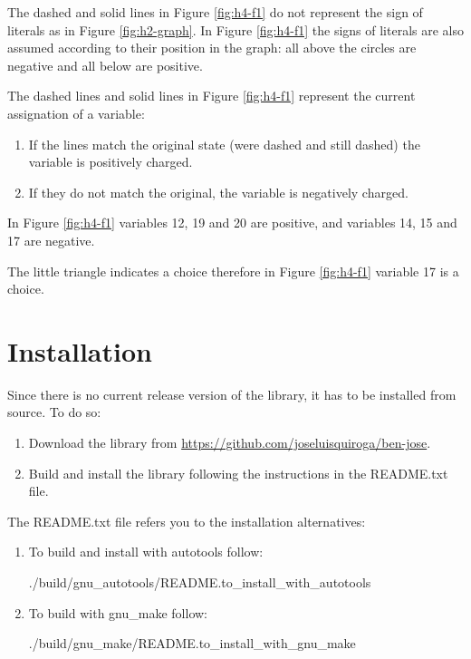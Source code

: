 \documentclass{easychair}
\begin{document}
The dashed and solid lines in Figure \ref{fig:h4-f1} do not represent the sign of literals as in Figure \ref{fig:h2-graph}. In Figure \ref{fig:h4-f1} the signs of literals are also assumed according to their position in the graph: all above the circles are negative and all below are positive. 

The dashed lines and solid lines in Figure \ref{fig:h4-f1} represent the current assignation of a variable: 

\begin{enumerate}
\item
If the lines match the original state (were dashed and still dashed) the variable is positively charged.

\item
If they do not match the original, the variable is negatively charged.
\end{enumerate}

In Figure \ref{fig:h4-f1} variables 12, 19 and 20 are positive, and variables 14, 15 and 17 are negative.

The little triangle indicates a choice therefore in Figure \ref{fig:h4-f1} variable 17 is a choice.

\section{Installation}
\label{sect:installation}

Since there is no current release version of the library, it has to be installed from source. To do so:

\begin{enumerate}
\item
Download the library from \url{https://github.com/joseluisquiroga/ben-jose}.

\item
Build and install the library following the instructions in the README.txt file.
\end{enumerate}

The README.txt file refers you to the installation alternatives:

\begin{enumerate}
\item
To build and install with autotools follow:

	./build/gnu\_autotools/README.to\_install\_with\_autotools

\item
To build with gnu\_make follow:

	./build/gnu\_make/README.to\_install\_with\_gnu\_make
\end{enumerate}
\end{document}
